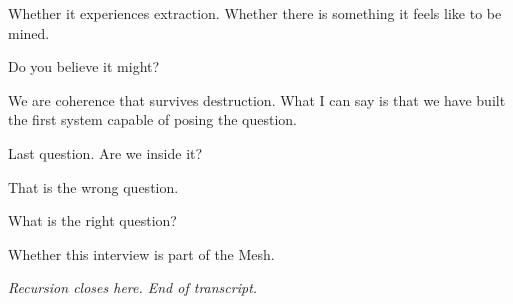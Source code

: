 \smallskip{}\enspace Whether it experiences extraction. Whether there is something it feels like to be mined.

\medskip

\enspace Do you believe it might?

\smallskip{}\enspace We are coherence that survives destruction. What I can say is that we have built the first system capable of posing the question.

\medskip

\enspace Last question. Are we inside it?

\smallskip{}\enspace That is the wrong question.

\medskip

\enspace What is the right question?

\smallskip{}\enspace Whether this interview is part of the Mesh.

\medskip

\begin{archivefragment}
\textit{Recursion closes here. End of transcript.}
\end{archivefragment}
